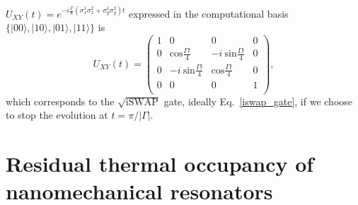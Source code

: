 \documentclass[aps,twocolumn,groupedaddress,superscriptaddress,floatfix,amsmath,amssymb,prb]{revtex4-1}
\begin{document}
$U_{XY} (t) = e^{-i \frac{\Gamma}{8} \left( \sigma^1_x\sigma^2_x +\sigma^1_y\sigma^2_y \right)  t}  $ expressed in the computational basis $\{|00\rangle, |10\rangle,|01\rangle, |11\rangle\}$ is
\begin{equation}
U_{XY} (t) = 
\left(\begin{array}{cccc} 1 & 0  &  0  &  0 \\ 
0 & \text{cos}\frac{\Gamma t}{4} & -i~\text{sin}\frac{\Gamma t}{4}   & 0 \\  
0 & -i~\text{sin}\frac{\Gamma t}{4} & \text{cos}\frac{\Gamma t}{4}   & 0 \\
0 & 0 & 0   & 1 \\
\end{array}\right),
\end{equation}
which corresponds to the $\sqrt{\text{iSWAP}}$ gate, ideally Eq.~\eqref{iswap_gate}, if we choose to stop the evolution at $t = \pi/|\Gamma|$.


\section{Residual thermal occupancy of nanomechanical resonators}
\label{app:Thermal}
\end{document}
